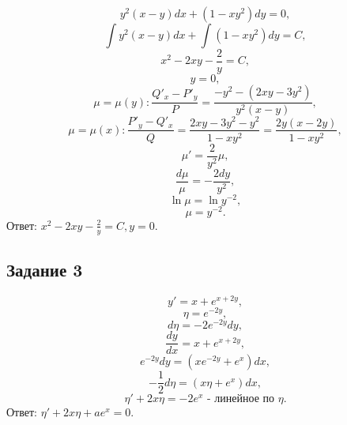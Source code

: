 \documentclass[11pt, a4paper]{article}
\begin{document}
	\par
	\begin{equation*}
		y^2(x - y)dx + (1 - xy^2)dy = 0,
	\end{equation*}
	\begin{equation*}
    	\int{y^2(x - y)dx} + \int{(1 - xy^2)dy} = C,
	\end{equation*}
	\begin{equation*}
    	x^2 - 2xy - \frac{2}{y} = C,
	\end{equation*}
	\begin{equation*}
    	y = 0,
	\end{equation*}
	\begin{equation*}
		\mu = \mu(y): \frac{Q'_x - P'_y}{P} = \frac{-y^2 - (2xy - 3y^2)}{y^2(x - y)},
	\end{equation*}
	\begin{equation*}
		\mu = \mu(x): \frac{P'_y - Q'_x}{Q} = \frac{2xy - 3y^2 - y^2}{1 - xy^2} = \frac{2y(x - 2y)}{1 - xy^2},
	\end{equation*}
	\begin{equation*}
    	\mu' = \frac{2}{y^2}\mu,
	\end{equation*}
	\begin{equation*}
    	\frac{d\mu}{\mu} = - \frac{2dy}{y^2},
	\end{equation*}
	\begin{equation*}
   		\ln{\mu} = \ln{y^{-2}},
	\end{equation*}
	\begin{equation*}
    	\mu = y^{-2}.
	\end{equation*}
	Ответ: $ x^2 - 2xy - \frac{2}{y} = C, y = 0$.
	
	
	\subsection*{Задание 3}
	
	\par
	\begin{equation*}
    	y' = x + e^{x + 2y},
	\end{equation*}
	\begin{equation*}
   		\eta = e^{-2y}, 
	\end{equation*}
	\begin{equation*}
    	d\eta = -2e^{-2y}dy,
	\end{equation*}
	\begin{equation*}
    	\frac{dy}{dx} = x + e^{x + 2y},
	\end{equation*}
	\begin{equation*}
    	e^{-2y}dy = (xe^{-2y} + e^x)dx,
	\end{equation*}
	\begin{equation*}
    	-\frac{1}{2}d\eta = (x\eta + e^x)dx,
	\end{equation*}
	\begin{equation*}
    	\eta' + 2x\eta = -2e^x \text{ - линейное по } \eta.
	\end{equation*}
	Ответ: $\eta' + 2x\eta + ae^x = 0$.
	
\end{document}
